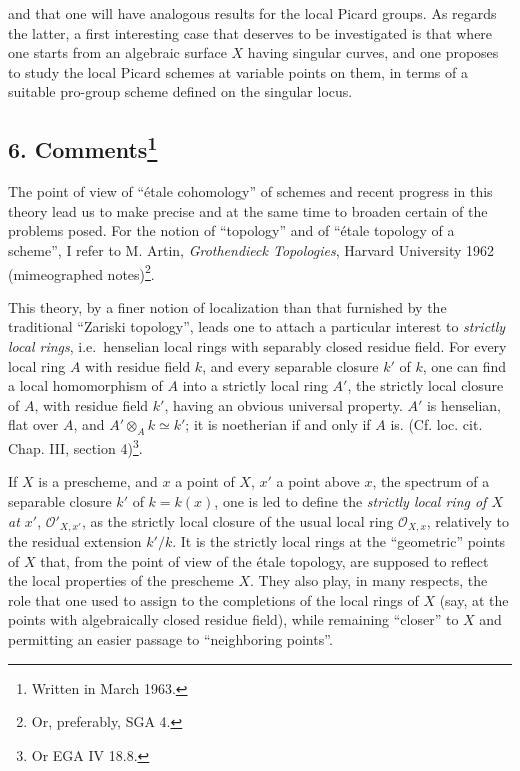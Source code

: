 \documentclass[
]{article}
\begin{document}
and that one will have analogous results for the local Picard groups. As
regards the latter, a first interesting case that deserves to be
investigated is that where one starts from an algebraic surface \(X\)
having singular curves, and one proposes to study the local Picard
schemes at variable points on them, in terms of a suitable pro-group
scheme defined on the singular locus.

\subsection[6. Comments]{\texorpdfstring{6.
Comments\footnote{Written in March 1963.}}{6. Comments}}\label{commentsxiii-6-1}

The point of view of ``étale cohomology'' of schemes and recent progress
in this theory lead us to make precise and at the same time to broaden
certain of the problems posed. For the notion of ``topology'' and of
``étale topology of a scheme'', I refer to M. Artin, \emph{Grothendieck
Topologies}, Harvard University 1962 (mimeographed notes)\footnote{Or,
  preferably, SGA 4.}.

This theory, by a finer notion of localization than that furnished by
the traditional ``Zariski topology'', leads one to attach a particular
interest to \emph{strictly local rings}, i.e.~henselian local rings with
separably closed residue field. For every local ring \(A\) with residue
field \(k\), and every separable closure \(k'\) of \(k\), one can find a
local homomorphism of \(A\) into a strictly local ring \(A'\), the
strictly local closure of \(A\), with residue field \(k'\), having an
obvious universal property. \(A'\) is henselian, flat over \(A\), and
\(A' \otimes_{A} k \simeq k'\); it is noetherian if and only if \(A\)
is. (Cf. loc. cit. Chap. III, section 4)\footnote{Or EGA IV 18.8.}.

If \(X\) is a prescheme, and \(x\) a point of \(X\), \(x'\) a point
above \(x\), the spectrum of a separable closure \(k'\) of \(k = k(x)\),
one is led to define the \emph{strictly local ring of \(X\) at \(x'\)},
\(\mathcal{O}'_{X,x'}\), as the strictly local closure of the usual
local ring \(\mathcal{O}_{X,x}\), relatively to the residual extension
\(k'/k\). It is the strictly local rings at the ``geometric'' points of
\(X\) that, from the point of view of the étale topology, are supposed
to reflect the local properties of the prescheme \(X\). They also play,
in many respects, the role that one used to assign to the completions of
the local rings of \(X\) (say, at the points with algebraically closed
residue field), while remaining ``closer'' to \(X\) and permitting an
easier passage to ``neighboring points''.
\end{document}
